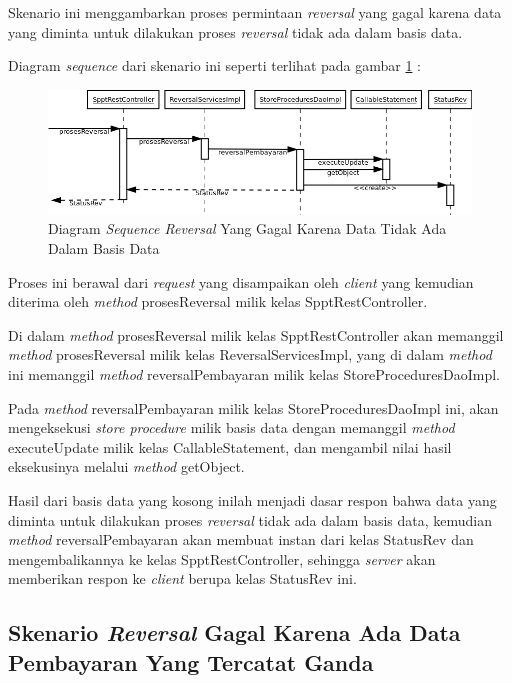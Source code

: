 Skenario ini menggambarkan proses permintaan \textit{reversal} yang gagal karena data yang diminta untuk dilakukan proses \textit{reversal} tidak ada dalam basis data.

Diagram \textit{sequence} dari skenario ini seperti terlihat pada gambar \ref{fig:uml-seq-rev-null} :

\begin{figure}[H]
  \centering
  \includegraphics[width=1\textwidth]{./resources/uml/uml-seq-rev-null}
  \caption{Diagram \textit{Sequence Reversal} Yang Gagal Karena Data Tidak Ada Dalam Basis Data}
  \label{fig:uml-seq-rev-null}
\end{figure}

Proses ini berawal dari \textit{request} yang disampaikan oleh \textit{client} yang kemudian diterima oleh \textit{method} prosesReversal milik kelas SpptRestController.

Di dalam \textit{method} prosesReversal milik kelas SpptRestController akan memanggil \textit{method} prosesReversal milik kelas ReversalServicesImpl, yang di dalam \textit{method} ini memanggil \textit{method} reversalPembayaran milik kelas StoreProceduresDaoImpl.

Pada \textit{method} reversalPembayaran milik kelas StoreProceduresDaoImpl ini, akan mengeksekusi \textit{store procedure} milik basis data dengan memanggil \textit{method} executeUpdate milik kelas CallableStatement, dan mengambil nilai hasil eksekusinya melalui \textit{method} getObject.

Hasil dari basis data yang kosong inilah menjadi dasar respon bahwa data yang diminta untuk dilakukan proses \textit{reversal} tidak ada dalam basis data, kemudian \textit{method} reversalPembayaran akan membuat instan dari kelas StatusRev dan mengembalikannya ke kelas SpptRestController, sehingga \textit{server} akan memberikan respon ke \textit{client} berupa kelas StatusRev ini.

\subsection{Skenario \textit{Reversal} Gagal Karena Ada Data Pembayaran Yang Tercatat Ganda}

